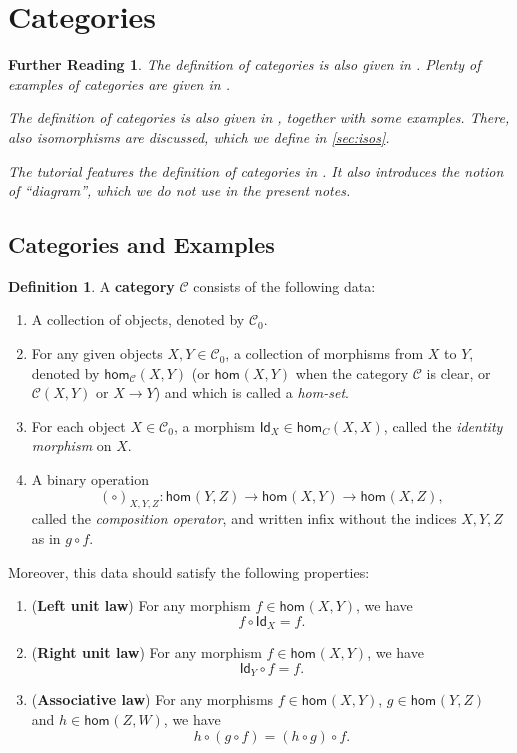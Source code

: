 \documentclass[a4paper,10pt]{scrartcl}
\theoremstyle{plain}
\newtheorem*{reading*}{Further Reading}
\theoremstyle{definition}
\newtheorem{dfn}[thm]{Definition}
\newcommand{\cfont}[1]{\ensuremath{\mathsf{#1}}}
\newcommand{\Cat}[1]{\mathcal{#1}}
\newcommand{\CC}{\Cat{C}}
\newcommand{\Ob}[1]{{#1}_0}
\newcommand{\Hom}[3][]{\cfont{hom}_{#1}(#2,#3)}
\newcommand{\CHom}[3]{{#1}(#2,#3)}
\newcommand{\Id}[1][]{\cfont{Id}_{#1}}
\newcommand{\co}[2]{\ensuremath{#2 \circ #1}}
\begin{document}
\section{Categories}
\label{sec:categories}

\begin{reading*}
The definition of categories is also given in \cite[\S 2.1]{barr-wells}. Plenty of examples of categories are given in \cite[\S\S 2.3--2.5]{barr-wells}.

  The definition of categories is also given in \cite[\S 1.1]{leinster}, together with some examples.
  There, also isomorphisms are discussed, which we define in \cref{sec:isos}.

  The tutorial \cite{pierce} features the definition of categories in \cite[\S 2.1]{pierce}.
  It also introduces the notion of ``diagram'', which we do not use in the present notes.
\end{reading*}


\subsection{Categories and Examples}

\begin{dfn}\label{dfn:category}
  A \textbf{category} $\CC$ consists of the following data:
\begin{enumerate}
\item A collection of objects, denoted by $\Ob{\CC}$.
\item For any given objects $X,Y \in \Ob{\CC}$, a collection of morphisms from $X$ to $Y$, denoted by $\Hom[\CC]{X}{Y}$ (or $\Hom{X}{Y}$ when the category $\CC$ is clear, or $\CHom \CC X Y$ or $X \to Y$) and which is called a \textit{hom-set}.
\item For each object $X\in \Ob{\CC}$, a morphism $\Id[X] \in \Hom[C]{X}{X}$, called the \textit{identity morphism} on $X$.
\item A binary operation
\[
(\co{}{})_{X,Y,Z} : \Hom{Y}{Z} \to \Hom X Y \to \Hom X Z,
\]
called the \textit{composition operator}, and written infix without the indices $X,Y,Z$ as in $\co{f}{g}$.
\end{enumerate}
Moreover, this data should satisfy the following properties:
\begin{enumerate}
\item (\textbf{Left unit law}) For any morphism $f \in \Hom X Y$, we have 
\[
 \co{\Id[X]} {f} = f.
\]
\item (\textbf{Right unit law}) For any morphism $f \in \Hom X Y$, we have 
\[
  \co f {\Id[Y]} = f.
\]
\item (\textbf{Associative law}) For any morphisms $f\in \Hom X Y$, $g\in \Hom Y Z$ and $h\in \Hom Z W$, we have
\[
     \co {(\co f g)}{h} =  \co f {(\co g  h)}.
\]
\end{enumerate}
\end{dfn}
\end{document}
